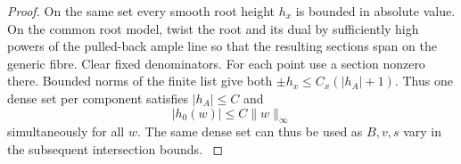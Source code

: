\begin{proof}
On the same set every smooth root height \(h_x\) is bounded in
absolute value. On the common root model, twist the root and its
dual by sufficiently high powers of the pulled-back ample line so
that the resulting sections span on the generic fibre. Clear fixed denominators.
For each point use a section nonzero there. Bounded norms of the
finite list give both \(\pm h_x\le C_x(|h_A|+1)\).
Thus one dense set per component satisfies
\(|h_A|\le C\) and
\[
 |h_0(w)|\le C\|w\|_\infty
\]
simultaneously for all \(w\). The same dense set can thus be used as \(B,v,s\) vary in the subsequent intersection bounds.
\label{cor:flag-point-heights-7}
\end{proof}
